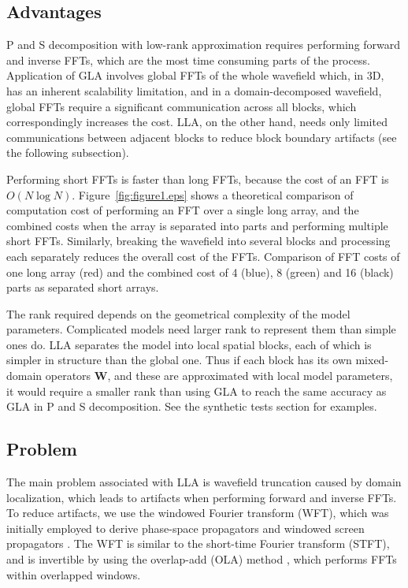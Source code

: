 \documentclass[manuscript,ulem,graphix,revised]{geophysics}
\begin{document}
\subsection{Advantages}
\indent\indent
P and S decomposition with low-rank approximation requires performing forward and inverse FFTs, which are the most time consuming parts of the process. 
Application of GLA involves global FFTs of the whole wavefield which, in 3D, has an inherent scalability limitation, and in a domain-decomposed wavefield, global FFTs require a significant communication across all blocks, which correspondingly increases the cost. LLA, on the other hand, needs only limited communications between adjacent blocks to reduce block boundary artifacts (see the following subsection).

Performing short FFTs is faster than long FFTs, because the cost of an FFT is $O(N\log{N})$. Figure~\ref{fig:figure1.eps} shows a theoretical comparison of computation cost of performing an FFT over a single long array, and the combined costs when the array is separated into parts and performing multiple short FFTs. 
Similarly, breaking the wavefield into several blocks and processing each separately reduces the overall cost of the FFTs. 
{
Comparison of FFT costs of one long array (red) and the combined cost of 4 (blue), 8 (green) and 16 (black) parts as separated short arrays.
}


The rank required depends on the geometrical complexity of the model parameters. Complicated models need larger rank to represent them than simple ones do. LLA separates the model into local spatial blocks, each of which is simpler in structure than the global one. Thus if each block has its own mixed-domain operators $\boldsymbol{W}$, and these are approximated with local model parameters, it would require a smaller rank than using GLA to reach the same accuracy as GLA in P and S decomposition. See the synthetic tests section for examples.

\subsection{Problem}
\indent\indent
The main problem associated with LLA is wavefield truncation caused by domain localization, which leads to artifacts when performing forward and inverse FFTs. To reduce artifacts, we use the windowed Fourier transform (WFT), which was initially employed to derive phase-space propagators \citep{steinberg95} and windowed screen propagators \citep{wu97}. The WFT is similar to the short-time Fourier transform (STFT), and is invertible by using the overlap-add (OLA) method \citep{crochiere80, liao93}, which performs FFTs within overlapped windows.
\end{document}
